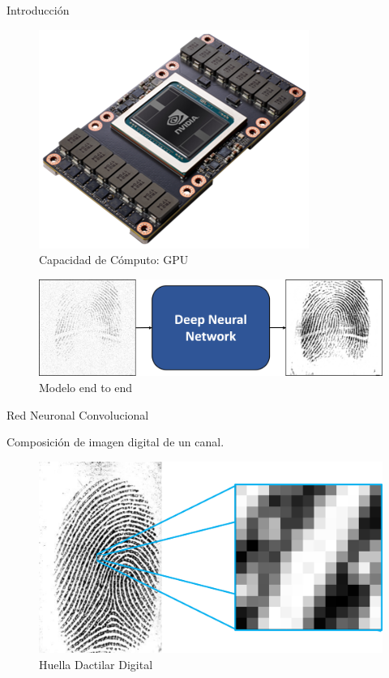 \documentclass[12pt]{beamer}
\begin{document}
\begin{frame}{Introducción}

    \begin{figure}[h]
        \includegraphics[scale=0.3]{figs/nvidia_card.png}
        \caption{Capacidad de Cómputo: GPU}
    \end{figure}
    
    \begin{figure}[h]
        \includegraphics[scale=0.3]{figs/end_to_end.png}
        \caption{Modelo end to end}
    \end{figure}

\end{frame}

\begin{frame}{Red Neuronal Convolucional}

    Composición de imagen digital de un canal.

    \begin{figure}[h]
        \includegraphics[scale=0.45]{figs/huella_pixeles.png}
        \caption{Huella Dactilar Digital}
    \end{figure}

\end{frame}
\end{document}
